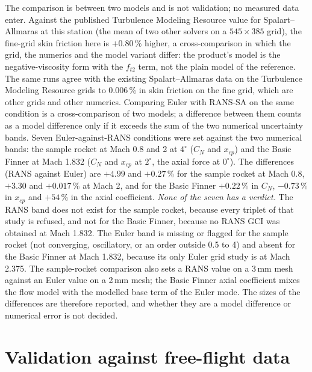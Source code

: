 \documentclass[11pt,a4paper]{article}
\begin{document}
The comparison is between two models and is not validation; no measured data enter.
Against the published Turbulence Modeling Resource value for Spalart--Allmaras at this station (the mean of two other solvers on a $545\times385$ grid), the fine-grid skin friction here is $+0.80\,\%$ higher, a cross-comparison in which the
grid, the numerics and the model variant differ: the product's model is the negative-viscosity form with the $f_{t2}$ term, not the plain model of the reference.
The same runs agree with the existing Spalart--Allmaras data on the Turbulence Modeling Resource grids to 0.006\,\% in skin friction on the fine grid, which are other grids and other numerics.
Comparing Euler with RANS-SA on the same condition is a cross-comparison of two models; a difference between
them counts as a model difference only if it exceeds the sum of the two numerical uncertainty bands.
Seven Euler-against-RANS conditions were set against the two numerical bands: the sample rocket at Mach 0.8 and 2 at $4^\circ$ ($C_N$ and $x_{cp}$) and the Basic Finner at Mach 1.832 ($C_N$ and $x_{cp}$ at $2^\circ$, the axial force at $0^\circ$).
The differences (RANS against Euler) are $+4.99$ and $+0.27\,\%$ for the sample rocket at Mach 0.8, $+3.30$ and $+0.017\,\%$ at Mach 2, and for the Basic Finner $+0.22\,\%$ in $C_N$, $-0.73\,\%$ in $x_{cp}$ and $+54\,\%$ in the axial coefficient.
\emph{None of the seven has a verdict.}
The RANS band does not exist for the sample rocket, because every triplet of that study is refused, and not for the Basic Finner, because no RANS GCI was obtained at Mach 1.832.
The Euler band is missing or flagged for the sample rocket (not converging, oscillatory, or an order outside 0.5 to 4) and absent for the Basic Finner at Mach 1.832, because its only Euler grid study is at Mach 2.375.
The sample-rocket comparison also sets a RANS value on a 3\,mm mesh against an Euler value on a 2\,mm mesh; the Basic Finner axial coefficient mixes the flow model with the modelled base term of the Euler mode.
The sizes of the differences are therefore reported, and whether they are a model difference or numerical error is not decided.

\section{Validation against free-flight data}
\label{sec:validation}
\end{document}
